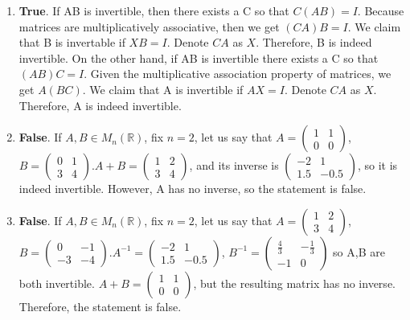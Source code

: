 \documentclass{article}
\begin{document}
\begin{enumerate}
\begin{enumerate}
\item \textbf{True}. If AB is invertible, then there exists a C so that $C(AB) = I$. Because matrices are multiplicatively associative, then we get $(CA)B = I$. We claim that B is invertable if $XB = I$. Denote $CA$ as $X$. Therefore, B is indeed invertible. On the other hand, if AB is invertible there exists a C so that $(AB)C = I$. Given the multiplicative association property of matrices, we get $A(BC)$. We claim that A is invertible if $AX = I$. Denote $CA$ as $X$. Therefore, A is indeed invertible.

\item \textbf{False}. If $A,B \in M_{n}(\mathbb{R})$, fix $n = 2$, let us say that $A = \left(\begin{array}{cc} 1 & 1 \\ 0 & 0 \end{array} \right)$,
$B = \left(\begin{array}{cc} 0 & 1 \\ 3 & 4 \end{array}\right)$.$A + B = \left(\begin{array}{cc} 1 & 2 \\ 3 & 4 \end{array} \right)$, and its inverse is
$\left(\begin{array}{cc} -2 & 1 \\ 1.5 & -0.5 \end{array} \right)$, so it is indeed invertible. However, A has no inverse, so the statement is false.

\item \textbf{False}. If $A,B \in M_{n}(\mathbb{R})$, fix $n = 2$, let us say that $A = \left(\begin{array}{cc} 1 & 2 \\ 3 & 4 \end{array} \right)$,
$B = \left(\begin{array}{cc} 0 & -1 \\ -3 & -4 \end{array}\right)$.$A^{-1} = \left(\begin{array}{cc} -2 & 1 \\ 1.5 & -0.5 \end{array}\right)$,
$B^{-1} = \left(\begin{array}{cc} \frac{4}{3} & -\frac{1}{3} \\ -1 & 0 \end{array}\right)$ so A,B are both invertible.
$A + B = \left(\begin{array}{cc} 1 & 1 \\ 0 & 0 \end{array} \right)$, but the resulting matrix has no inverse. Therefore, the statement is false.


\end{enumerate}
\end{enumerate}
\end{document}
